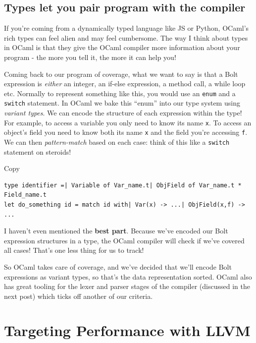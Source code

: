 \hypertarget{types-let-you-pair-program-with-the-compiler}{%
\subsection{\texorpdfstring{\protect\hyperlink{types-let-you-pair-program-with-the-compiler}{}Types
let you pair program with the
compiler}{Types let you pair program with the compiler}}\label{types-let-you-pair-program-with-the-compiler}}

If you're coming from a dynamically typed language like JS or Python,
OCaml's rich types can feel alien and may feel cumbersome. The way I
think about types in OCaml is that they give the OCaml compiler more
information about your program - the more you tell it, the more it can
help you!

Coming back to our program of coverage, what we want to say is that a
Bolt expression is \emph{either} an integer, an if-else expression, a
method call, a while loop etc. Normally to represent something like
this, you would use an \texttt{enum} and a \texttt{switch} statement. In
OCaml we bake this ``enum'' into our type system using \emph{variant
types}. We can encode the structure of each expression within the type!
For example, to access a variable you only need to know its name
\texttt{x}. To access an object's field you need to know both its name
\texttt{x} and the field you're accessing \texttt{f}. We can then
\emph{pattern-match} based on each case: think of this like a
\texttt{switch} statement on steroids!

Copy

\begin{lstlisting}[language=caml]
type identifier =| Variable of Var_name.t| ObjField of Var_name.t * Field_name.t
let do_something id = match id with| Var(x) -> ...| ObjField(x,f) -> ...
\end{lstlisting}

I haven't even mentioned the \textbf{best part}. Because we've encoded
our Bolt expression structures in a type, the OCaml compiler will check
if we've covered all cases! That's one less thing for us to track!

So OCaml takes care of coverage, and we've decided that we'll encode
Bolt expressions as variant types, so that's the data representation
sorted. OCaml also has great tooling for the lexer and parser stages of
the compiler (discussed in the next post) which ticks off another of our
criteria.

\hypertarget{targeting-performance-with-llvm}{%
\section{\texorpdfstring{\protect\hyperlink{targeting-performance-with-llvm}{}Targeting
Performance with
LLVM}{Targeting Performance with LLVM}}\label{targeting-performance-with-llvm}}

